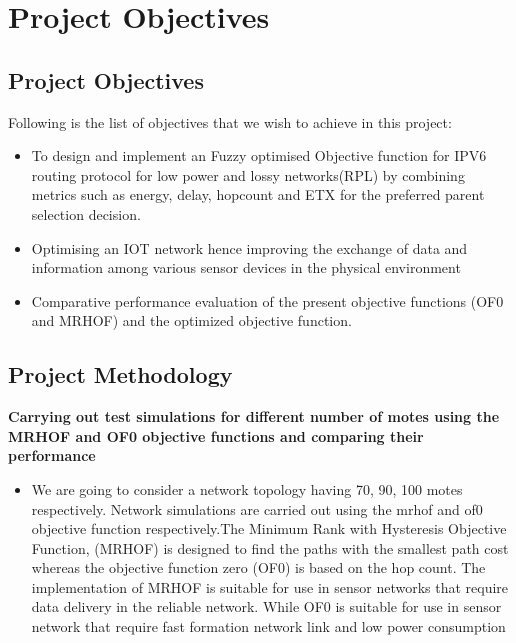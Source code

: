 \chapter{Project Objectives} \label{Project Objectives}
\section{Project Objectives} \label{Project Objective}
\noindent Following is the list of objectives that we wish to achieve in this project:\\
\vspace{-1cm}
\begin{itemize}
\item To design and implement an Fuzzy optimised Objective function for IPV6 routing protocol for low power and lossy networks(RPL) by  combining metrics such as energy, delay, hopcount and ETX for the preferred parent selection decision. 
\item Optimising an IOT network hence improving the exchange of data and information among various sensor devices in the physical environment
\item Comparative performance evaluation of the present objective functions (OF0 and MRHOF) and the optimized objective function.
\end{itemize}

\section{Project Methodology} \label{Project Methodology}
\noindent\textbf{Carrying out test simulations for different number of motes using the MRHOF and OF0 objective functions and comparing their performance\\
}\vspace{-1cm}
\begin{itemize}
\item We are going to consider a network topology having 70, 90, 100 motes respectively. Network simulations are carried out using the mrhof and of0 objective function respectively.The Minimum Rank with Hysteresis Objective Function, (MRHOF) is designed to find the paths with the smallest path cost whereas the objective function zero (OF0) is based on the hop count. The implementation of MRHOF is suitable for use in sensor networks that require data delivery in the reliable network. While OF0 is suitable for use in sensor network that require fast formation network link and low power consumption
\end{itemize}



